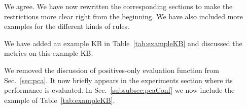 We agree. We have now rewritten the corresponding sections to make the restrictions more clear right from the beginning. We have also included more examples for the different kinds of rules.


      We have added an example KB in  Table~\ref{tab:exampleKB} and discussed the metrics on this example KB.


      We removed the discussion of positives-only evaluation function from Sec.~\ref{sec:pca}.  It now briefly appears in the experiments section where its performance is evaluated.
      In Sec.~\ref{subsubsec:pcaConf} we now include the example of Table~\ref{tab:exampleKB}.

\twocolumn
